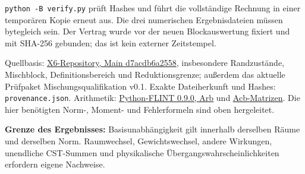 \documentclass[10pt,a4paper]{article}
\begin{document}
\texttt{python -B verify.py} prüft Hashes und führt die vollständige Rechnung
in einer temporären Kopie erneut aus. Die drei numerischen Ergebnisdateien
müssen bytegleich sein. Der Vertrag wurde vor der neuen Blockauswertung
fixiert und mit SHA-256 gebunden; das ist kein externer Zeitstempel.

Quellbasis: \href{https://github.com/thomasmgfeller/x6-spectral-astrolabium/tree/d7acdb6a2558bbec0b6c2c208742debc55479e75}{X6-Repository, Main d7acdb6a2558},
insbesondere Randzustände, Mischblock, Definitionsbereich und Reduktionsgrenze;
außerdem das aktuelle Prüfpaket Mischungsqualifikation v0.1.
Exakte Dateiherkunft und Hashes: \texttt{provenance.json}.
Arithmetik: \href{https://python-flint.readthedocs.io/en/latest/arb.html}{Python-FLINT 0.9.0, Arb}
und \href{https://python-flint.readthedocs.io/en/latest/acb_mat.html}{Acb-Matrizen}.
Die hier benötigten Norm-, Moment- und Fehlerformeln sind oben hergeleitet.

\textbf{Grenze des Ergebnisses:} Basisunabhängigkeit gilt innerhalb derselben
Räume und derselben Norm. Raumwechsel, Gewichtswechsel, andere Wirkungen,
unendliche CST-Summen und physikalische Übergangswahrscheinlichkeiten
erfordern eigene Nachweise.
\end{document}
